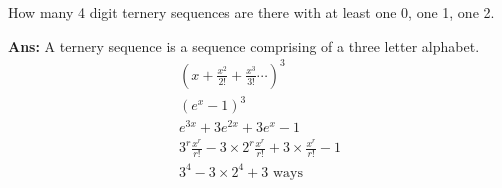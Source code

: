 \begin{example}
    How many 4 digit ternery sequences are there with at least one 0, one 1, one 2.

    \textbf{Ans:} A ternery sequence is a sequence comprising of a three letter alphabet.
    \begin{gather*}
        {\left(x + \frac{x^2}{2!} +\frac{x^3}{3!} \cdots \right)}^3\\
        {(e^x - 1)}^3 \\
        e^{3x} + 3e^{2x} + 3e^x - 1 \\
        3^r \frac{x^r}{r!} - 3 \times 2^r \frac{x^r}{r!} + 3 \times \frac{x^r}{r!} - 1 \tag*{r = 4}\\
        3^4 - 3 \times 2^4 + 3 \text{ ways}
    \end{gather*}
\end{example}

